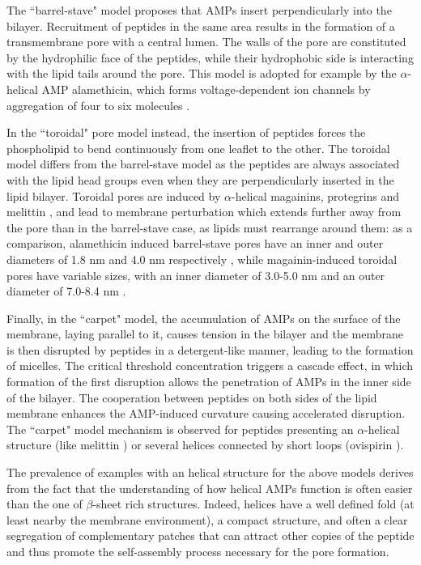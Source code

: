 The ``barrel-stave" model proposes that AMPs insert perpendicularly into the bilayer.
Recruitment of peptides in the same area results in the formation of a transmembrane pore with a central lumen. The walls of the pore are constituted by the hydrophilic face of the peptides, while their hydrophobic side is interacting with the lipid tails around the pore. This model is adopted for example by the $\alpha$-helical AMP alamethicin, which forms voltage-dependent ion channels by aggregation of four to six molecules \citep{Spaar2004}.

In the ``toroidal" pore model instead, the insertion of peptides forces the phospholipid to bend continuously from one leaflet to the other.
%
The toroidal model differs from the barrel-stave model as the peptides are always associated with the lipid head groups even when they are perpendicularly inserted in the lipid  bilayer. Toroidal pores are induced by $\alpha$-helical magainins, protegrins and melittin \citep{Yang2001,Matsuzaki1996,Hallock2003}, and lead to membrane perturbation which extends further away from the pore than in the barrel-stave case, as lipids must rearrange around them: as a comparison, alamethicin induced barrel-stave pores have an inner and outer diameters of 1.8 nm and 4.0 nm respectively \citep{Spaar2004}, while magainin-induced toroidal pores have variable sizes, with an inner diameter of 3.0-5.0 nm and an outer diameter of 7.0-8.4 nm \citep{Matsuzaki1997}.

Finally, in the ``carpet" model, the accumulation of AMPs on the surface of the membrane, laying parallel to it, causes tension in the bilayer and the membrane is then disrupted by peptides in a detergent-like manner, leading to the formation of micelles.
%
The critical threshold concentration triggers a cascade effect, in which formation of the first disruption allows the penetration of AMPs in the inner side of the bilayer. The cooperation between peptides on both sides of the lipid membrane enhances the AMP-induced curvature causing accelerated disruption.
%
The ``carpet" model mechanism is observed for peptides presenting an $\alpha$-helical structure (like melittin \citep{Ladokhin2001}) or several helices connected by short loops (ovispirin \citep{Yamaguchi2001}).

The prevalence of examples with an helical structure for the above models derives from the fact that the understanding of how helical AMPs function is often easier than the one of $\beta$-sheet rich structures.
%
Indeed, helices have a well defined fold (at least nearby the membrane environment), a compact structure, and often a clear segregation of complementary patches that can attract other copies of the peptide and thus promote the self-assembly process necessary for the pore formation.

